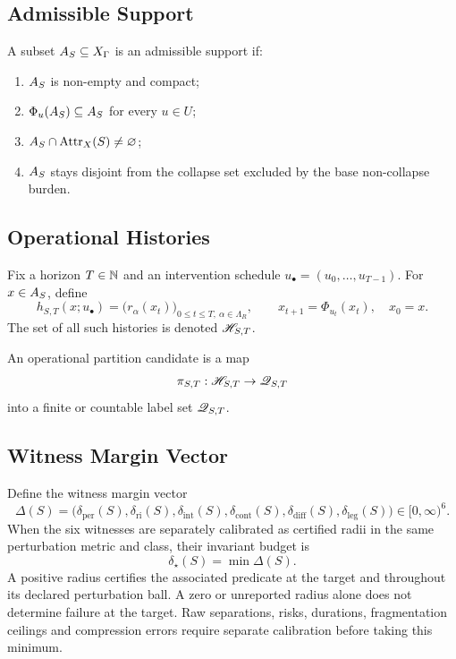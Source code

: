 \subsection{Admissible Support}

\begin{definition}\label{def:support}
A subset $A_S\subseteq X_\Gamma$ is an admissible support if:
\begin{enumerate}[leftmargin=1.5em]
\item $A_S$ is non-empty and compact;
\item $\Phi_u(A_S)\subseteq A_S$ for every $u\in U$;
\item $A_S\cap \operatorname{Attr}_X(S)\neq\varnothing$;
\item $A_S$ stays disjoint from the collapse set excluded by the base non-collapse burden.
\end{enumerate}
\end{definition}

\subsection{Operational Histories}

\begin{definition}\label{def:history}
Fix a horizon $T\in\mathbb{N}$ and an intervention schedule $u_\bullet=(u_0,\dots,u_{T-1})$. For $x\in A_S$, define
\[
h_{S,T}(x;u_\bullet)=\bigl(r_\alpha(x_t)\bigr)_{0\le t\le T,\ \alpha\in\Lambda_R},
\qquad
x_{t+1}=\Phi_{u_t}(x_t),\quad x_0=x.
\]
The set of all such histories is denoted $\mathscr{H}_{S,T}$.
\end{definition}

\begin{definition}\label{def:partition}
An operational partition candidate is a map
\[
\pi_{S,T}:\mathscr{H}_{S,T}\to \mathscr{Q}_{S,T}
\]
into a finite or countable label set $\mathscr{Q}_{S,T}$.
\end{definition}

\subsection{Witness Margin Vector}

\begin{definition}\label{def:margins}
Define the witness margin vector
\[
\Delta(S)=
\bigl(
\delta_{\mathrm{per}}(S),
\delta_{\mathrm{ri}}(S),
\delta_{\mathrm{int}}(S),
\delta_{\mathrm{cont}}(S),
\delta_{\mathrm{diff}}(S),
\delta_{\mathrm{leg}}(S)
\bigr)\in [0,\infty)^6.
\]
When the six witnesses are separately calibrated as certified radii in the same perturbation metric and class, their invariant budget is
\[
\delta_\star(S)=\min\Delta(S).
\]
A positive radius certifies the associated predicate at the target and throughout its declared perturbation ball. A zero or unreported radius alone does not determine failure at the target. Raw separations, risks, durations, fragmentation ceilings and compression errors require separate calibration before taking this minimum.
\end{definition}

